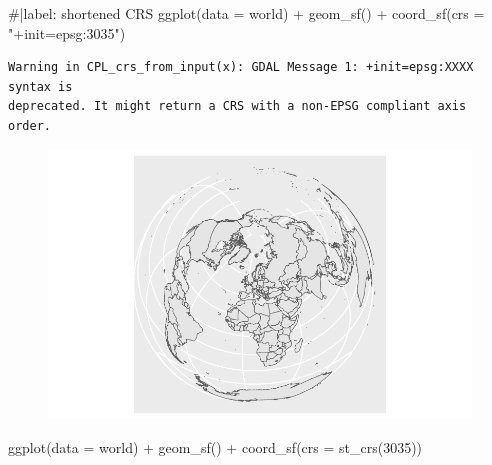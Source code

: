 \documentclass[
  letterpaper,
  DIV=11,
  numbers=noendperiod]{scrartcl}
\newenvironment{Shaded}{\begin{snugshade}}{\end{snugshade}}
\newcommand{\AttributeTok}[1]{\textcolor[rgb]{0.40,0.45,0.13}{#1}}
\newcommand{\CommentTok}[1]{\textcolor[rgb]{0.37,0.37,0.37}{#1}}
\newcommand{\DecValTok}[1]{\textcolor[rgb]{0.68,0.00,0.00}{#1}}
\newcommand{\FunctionTok}[1]{\textcolor[rgb]{0.28,0.35,0.67}{#1}}
\newcommand{\NormalTok}[1]{\textcolor[rgb]{0.00,0.23,0.31}{#1}}
\newcommand{\SpecialCharTok}[1]{\textcolor[rgb]{0.37,0.37,0.37}{#1}}
\newcommand{\StringTok}[1]{\textcolor[rgb]{0.13,0.47,0.30}{#1}}
\begin{document}
\begin{Shaded}
\begin{Highlighting}[]
\CommentTok{\#|label: shortened CRS }
\FunctionTok{ggplot}\NormalTok{(}\AttributeTok{data =}\NormalTok{ world) }\SpecialCharTok{+}     
  \FunctionTok{geom\_sf}\NormalTok{() }\SpecialCharTok{+}     
  \FunctionTok{coord\_sf}\NormalTok{(}\AttributeTok{crs =} \StringTok{"+init=epsg:3035"}\NormalTok{)  }
\end{Highlighting}
\end{Shaded}

\begin{verbatim}
Warning in CPL_crs_from_input(x): GDAL Message 1: +init=epsg:XXXX syntax is
deprecated. It might return a CRS with a non-EPSG compliant axis order.
\end{verbatim}

\begin{figure}[H]

{\centering \includegraphics{Introduction-to-mapping_files/figure-pdf/unnamed-chunk-11-1.pdf}

}

\end{figure}

\begin{Shaded}
\begin{Highlighting}[]
\FunctionTok{ggplot}\NormalTok{(}\AttributeTok{data =}\NormalTok{ world) }\SpecialCharTok{+}     
  \FunctionTok{geom\_sf}\NormalTok{() }\SpecialCharTok{+}     
  \FunctionTok{coord\_sf}\NormalTok{(}\AttributeTok{crs =} \FunctionTok{st\_crs}\NormalTok{(}\DecValTok{3035}\NormalTok{)) }
\end{Highlighting}
\end{Shaded}
\end{document}
